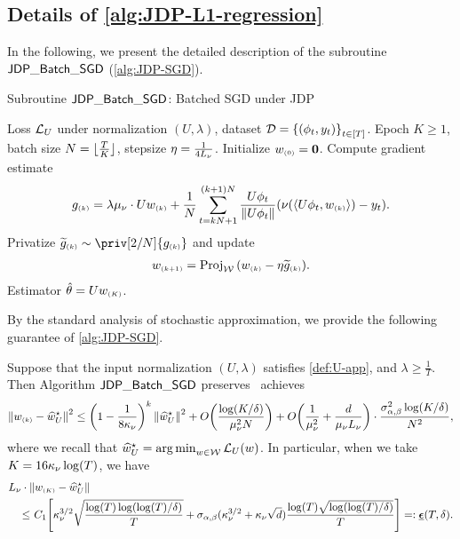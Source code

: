 


\subsection{Details of \cref{alg:JDP-L1-regression}}\label{appdx:JDP-l1-regression}

In the following, we present the detailed description of the subroutine $\mathsf{JDP\_Batch\_SGD}$ (\cref{alg:JDP-SGD}).

\begin{algorithm}[H]
\caption{Subroutine $\mathsf{JDP\_Batch\_SGD}$: Batched SGD under JDP}\label{alg:JDP-SGD}
\begin{algorithmic}
\REQUIRE Loss $\mathcal{L}_{U}$ under normalization $(U,\lambda)$, dataset $\mathcal{D}=\left\{(\phi_t,y_t)\right\}_{t\in[T]}$.
\REQUIRE Epoch $K\geq 1$, batch size $N=\lfloor\frac{T}{K}\rfloor$, stepsize $\eta=\frac{1}{4L_\nu}$. %
\STATE Initialize $w_{\scriptscriptstyle{ (0) }}=\mathbf{0}$.
\STATE Compute gradient estimate
\begin{align*}
    g_{\scriptscriptstyle{ (k) }}=\lambda\mu_\nu \cdot  U w_{\scriptscriptstyle{ (k) }}+\frac1N \sum_{t=kN+1}^{(k+1)N} \frac{U\phi_t}{\|U\phi_t\|}{\left(  \nu(\langle U\phi_t, w_{\scriptscriptstyle{ (k) }} \rangle) -y_t  \right)}.
\end{align*}
\STATE Privatize $\til g\kk\sim \priv[2/N]{g\kk}$ and update
\begin{align*}
    w_{\scriptscriptstyle{ (k+1) }}=\operatorname{Proj}_{\mathcal{W}}{\left(  w_{\scriptscriptstyle{ (k) }}-\eta \widetilde g_{\scriptscriptstyle{ (k) }}  \right)}.
\end{align*}
\ENDFOR
\ENSURE Estimator $\hat{\theta}= U w_{\scriptscriptstyle{ (K) }}$.
\end{algorithmic}
\end{algorithm}

By the standard analysis of stochastic approximation, we provide the following guarantee of \cref{alg:JDP-SGD}.
\begin{proposition}\label{prop:JDP-GD}
Suppose that the input normalization $(U,\lambda)$ satisfies \eqref{def:U-app}, and $\lambda\geq \frac{1}{T}$. Then Algorithm $\mathsf{JDP\_Batch\_SGD}$ preserves \aJDP~achieves \whp
\begin{align*}
    \left\|w_{\scriptscriptstyle{ (k) }}-\widehat{w}^\star_U\right\|^2\leq {\left(  1-\frac{1}{8\kappa_\nu}  \right)}^k\left\|\widehat{w}^\star_U\right\|^2+O{\left( \frac{\log(K/\delta)}{\mu_\nu^2N} \right)}+O{\left( \frac{1}{\mu_\nu^2}+\frac{d}{\mu_\nu L_\nu} \right)}\cdot \frac{\sigma_{\alpha,\beta}^2\log(K/\delta)}{N^2},
\end{align*} 
where we recall that $\widehat{w}^\star_U=\operatorname*{arg\,min}_{w\in\mathcal{W}} \mathcal{L}_{U}(w)$. 
In particular, when we take $K=16\kappa_\nu \log(T)$, we have
\begin{align}\label{eq:def:lamgd}
\begin{aligned}
\MoveEqLeft    \Lipg\cdot \nrm{w\kc-\hwst} \\
\leq&~ C_1\brac{ \kpg^{3/2}\sqrt{\frac{\log(T)\log(\log(T)/\delta)}{T}}+ \siga (\kpg^{3/2}+\kpg\sqrt{d})\frac{ \log(T)\sqrt{\log(\log(T)/\delta)}}{T} }=:\lamgd(T,\delta).
\end{aligned}
\end{align}
\end{proposition}

